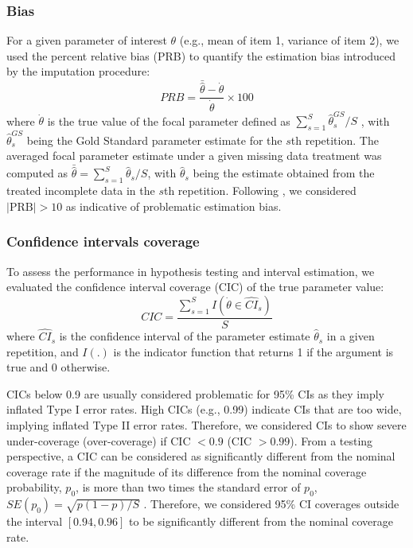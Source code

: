 	\subsubsection{Bias}

	For a given parameter of interest $\theta$ (e.g., mean of item 1, variance of item 2), we used the 
	percent relative bias (PRB) to quantify the estimation bias introduced by the imputation procedure:
%
	\begin{equation} \label{eqn:prb}
		\textit{PRB} = \frac{\bar{\hat{\theta}} - \dot{\theta}}{\dot{\theta}} \times 100
	\end{equation}
%
	where $\dot{\theta}$ is the true value of the focal parameter defined as 
	$\sum_{s=1}^{S} \hat{\theta}_{s}^{GS}/S$
	, with
	$\hat{\theta}_{s}^{GS}$ 
	being the Gold Standard parameter estimate for the $s$th repetition. 
	The averaged focal parameter estimate under a given missing data treatment was computed as 
	$\bar{\hat{\theta}} = \sum_{s=1}^{S} \hat{\theta}_{s}/S$,
	with
	$\hat{\theta}_{s}$ being the estimate obtained from the treated incomplete data in the 
	$s$th repetition.
	Following \cite{muthenEtAl:1987}, we considered $|\text{PRB}| > 10$ as indicative of problematic 
	estimation bias.

	\subsubsection{Confidence intervals coverage}
	
	To assess the performance in hypothesis testing and interval estimation, we evaluated the confidence interval coverage (CIC) of the true parameter value:
%
	\begin{equation} \label{eqn:cic}
		\textit{CIC} =  \frac{ \sum_{s=1}^{S} I(\dot{\theta} \in \widehat{\textit{CI}}_s ) }{S}
	\end{equation}
%
	where $\widehat{\textit{CI}}_s$ is the confidence interval of the parameter estimate $\hat{\theta}_{s}$ in a given repetition, 
	and $I(.)$ is the indicator function that returns 1 if the argument is true and 0 otherwise.
	
	CICs below 0.9 are usually considered problematic for 95\% CIs \cite[p. 52]{vanBuuren:2018} 
	as they imply inflated Type I error rates.
	High CICs (e.g., 0.99) indicate CIs that are too wide, implying inflated Type II error rates.
	Therefore, we considered CIs to show severe under-coverage (over-coverage) if CIC $< 0.9$ (CIC $> 0.99$). From a testing perspective, a CIC can be considered as significantly different from the 
	nominal coverage rate if the magnitude of its difference from the nominal coverage probability, $p_0$, is more than two times the standard error of $p_0$, $\textit{SE}(p_0) = \sqrt{p (1-p)/S}$ \citep{burtonEtAl:2006}.
	Therefore, we considered 95\% CI coverages outside the interval $[0.94, 0.96]$ to be significantly different from the nominal coverage rate.

